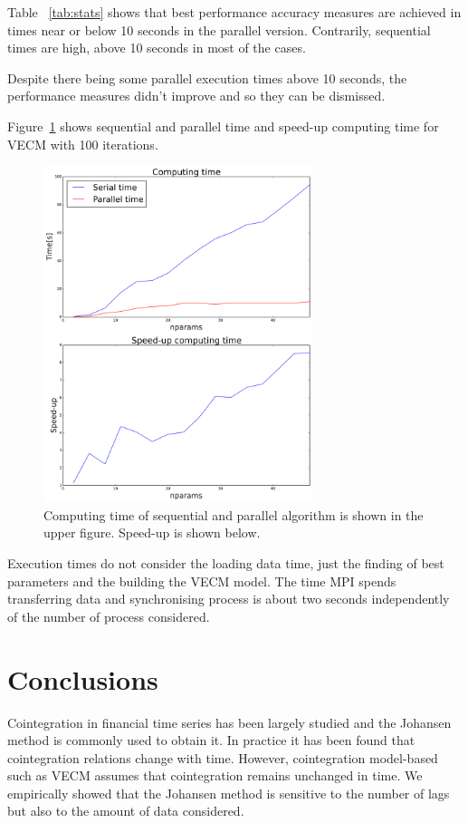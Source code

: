 Table ~\ref{tab:stats} shows that best performance accuracy measures are
achieved in times near or below 10 seconds in the parallel version. Contrarily,
sequential times are high, above 10 seconds in most of the cases.

Despite there being some parallel execution times above 10 seconds, the
performance measures didn't improve and so they can be dismissed.

Figure~\ref{fig:extimes} shows sequential and parallel time and speed-up
computing time for VECM with 100 iterations.

\begin{figure}[!h]
  \centering
  \includegraphics[width=0.7\textwidth]{img/extimes}
  \caption{Computing time of sequential and parallel algorithm is shown in the
  upper figure. Speed-up is shown below.}
  \label{fig:extimes}
\end{figure}


Execution times do not consider the loading data time, just the finding of
best parameters and the building the VECM model. The time MPI spends
transferring data and synchronising process is about two seconds independently
of the number of process considered.

\section{Conclusions}
\label{sec:conclusions}
Cointegration in financial time series has been largely studied and the 
Johansen method is commonly used to obtain it. 
In practice it has been found that cointegration relations change with time. 
However, cointegration model-based such as VECM assumes that cointegration
remains unchanged in time. 
We empirically showed that the Johansen method is sensitive to the number
of lags but also to the amount of data considered.


